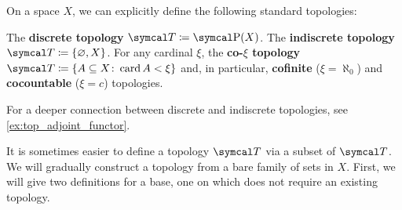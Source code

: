 \begin{definition}\label{def:standard_topologies}
  On a space \( X \), we can explicitly define the following standard topologies:
  \begin{defenum}
     The \textbf{discrete topology} \( \Cal{T} \coloneqq \Power(X) \).
     The \textbf{indiscrete topology} \( \Cal{T} \coloneqq \{ \varnothing, X \} \).
     For any cardinal \( \xi \), the \textbf{co-\( \xi \) topology} \( \Cal{T} \coloneqq \{ A \subseteq X \colon \Card A < \xi \} \) and, in particular, \textbf{cofinite} (\( \xi = \aleph_0 \)) and \textbf{cocountable} (\( \xi = c \)) topologies.
  \end{defenum}

  For a deeper connection between discrete and indiscrete topologies, see \cref{ex:top_adjoint_functor}.
\end{definition}

\begin{remark}\label{note:abritrary_family_to_topology}
  It is sometimes easier to define a topology \( \Cal{T} \) via a subset of \( \Cal{T} \). We will gradually construct a topology from a bare family of sets in \( X \). First, we will give two definitions for a base, one on which does not require an existing topology.
\end{remark}

